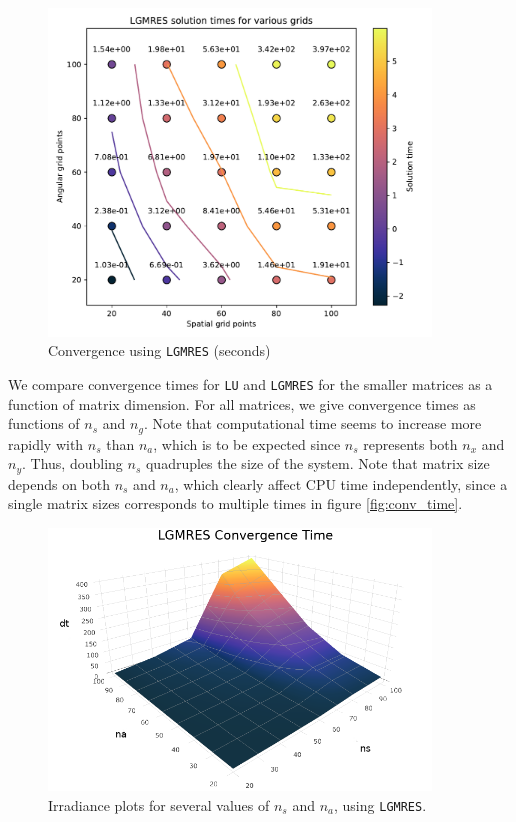 \documentclass[10pt]{article}
\begin{document}
\begin{multicols}{2}
\begin{figure}[H]
	\centering
	\includegraphics[width=4in]{img/lgmres_time.pdf}
	\caption{Convergence using \texttt{LGMRES} (seconds)}
\end{figure}

We compare convergence times for \texttt{LU} and \texttt{LGMRES} for the smaller matrices as a function of matrix dimension.
For all matrices, we give convergence times as functions of $n_s$ and $n_g$.
Note that computational time seems to increase more rapidly with $n_s$ than $n_a$, which is to be expected since $n_s$ represents both $n_x$ and $n_y$.
Thus, doubling $n_s$ quadruples the size of the system.
Note that matrix size depends on both $n_s$ and $n_a$, which clearly affect CPU time independently, since a single matrix sizes corresponds to multiple times in figure \ref{fig:conv_time}.

\vspace{2em}

\begin{figure}[H]
	\centering
	\includegraphics[width=4in]{img/lgmres_time_3d.png}
	\caption{Irradiance plots for several values of $n_s$ and $n_a$, using \texttt{LGMRES}.}
\end{figure}


\end{multicols}
\pagebreak
\end{document}
